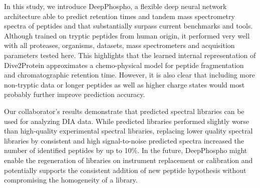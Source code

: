 In this study, we introduce DeepPhospho, a flexible deep neural network architecture able to predict retention times and
tandem mass spectrometry spectra of peptides and that substantially surpass current
benchmarks and tools. Although trained on tryptic peptides from human origin, it performed very well with all proteases,
organisms, datasets, mass spectrometers and acquisition parameters tested here. This highlights that the learned internal
representation of Dive2Protein approximates a chemo-physical model for peptide fragmentation and chromatographic retention time.
However, it is also clear that including more non-tryptic data or longer peptides as well as higher charge states would
most probably further improve prediction accuracy.

Our collaborator's results demonstrate that predicted spectral libraries can be used for analyzing DIA data. While predicted
libraries performed slightly worse than high-quality experimental spectral libraries, replacing lower quality
spectral libraries by consistent and high signal-to-noise predicted spectra increased the number of identified
peptides by up to 10$\%$. In the future, DeepPhospho might enable the regeneration of libraries on instrument replacement
or calibration and potentially supports the consistent addition of new peptide hypothesis without compromising
the homogeneity of a library.